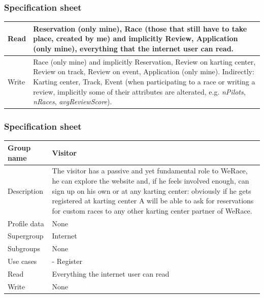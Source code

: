 \documentclass{beamer}
\newcommand{\kc}{WeRace}
\begin{document}
\begin{frame}
    \frametitle{Specification sheet}
\begin{table}
    \tiny
    \begin{tabular}{|p{2cm}|p{6cm}|}
        \hline
        Read & Reservation (only mine),
        Race (those that still have to take place, created by me) and implicitly Review,
        Application (only mine), everything that the internet user can read. \\
        \hline
        Write & Race (only mine) and implicitly Reservation, Review on karting center, 
        Review on track, Review on event, Application (only mine). \newline
        Indirectly: Karting center, Track, Event (when participating to a race or writing a review, implicitly some of their 
        attributes are alterated, e.g. \textit{nPilots}, \textit{nRaces}, \textit{avgReviewScore}). \\
        \hline
        \end{tabular}
    \end{table}
\end{frame}

\begin{frame}
    \frametitle{Specification sheet}
    \begin{table}
        \tiny
        \begin{tabular}{|p{2cm}|p{6cm}|}
        \hline
        Group name & \textbf{Visitor} \\
        \hline
        Description & The visitor has a passive and yet fundamental role to \kc{}, he can 
        explore the website and, if he feels involved enough, can sign up on his own or at any
        karting center: obviously if he gets registered at karting center A will be able to
        ask for reservations for custom races to any other karting center partner of \kc{}.  \\
        \hline
        Profile data & None \\
        \hline
        Supergroup & Internet \\
        \hline
        Subgroups & None \\
        \hline
        Use cases &
        - Register \\
        \hline
        Read & Everything the internet user can read \\
        \hline
        Write & None \\
        \hline
        \end{tabular}
    \end{table}
\end{frame}
\end{document}
